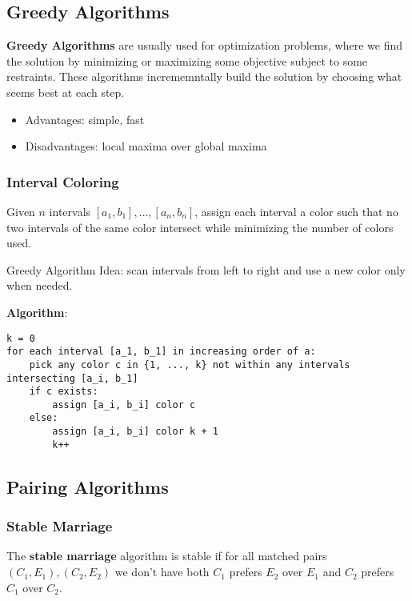 \documentclass[12pt]{article}
\begin{document}
\subsection{Greedy Algorithms}
{\bf Greedy Algorithms} are usually used for optimization problems, where we find the solution by minimizing or maximizing some objective subject to some restraints. These algorithms incrememntally build the solution by choosing what seems best at each step.
\begin{itemize}
\item Advantages: simple, fast
\item Disadvantages: local maxima over global maxima
\end{itemize}


\subsubsection{Interval Coloring}
\begin{example}
Given $n$ intervals $[a_1, b_1], \dots, [a_n, b_n]$, assign each interval a color such that no two intervals of the same color intersect while minimizing the number of colors used.

Greedy Algorithm Idea: scan intervals from left to right and use a new color only when needed.

{\bf Algorithm}:
\begin{verbatim}
k = 0
for each interval [a_1, b_1] in increasing order of a:
    pick any color c in {1, ..., k} not within any intervals intersecting [a_i, b_1]
    if c exists:
        assign [a_i, b_i] color c
    else:
        assign [a_i, b_i] color k + 1
        k++
\end{verbatim}
\end{example}

\subsection{Pairing Algorithms}

\subsubsection{Stable Marriage}

The {\bf stable marriage} algorithm is stable if for all matched pairs $(C_1, E_1), (C_2, E_2)$ we don't have both $C_1$ prefers $E_2$ over $E_1$ and $C_2$ prefers $C_1$ over $C_2$.
\end{document}

